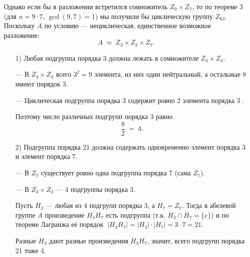 \documentclass[a4paper]{article}
\begin{document}
\begin{enumerate}
    Однако если бы в разложении встретился сомножитель \(Z_{9}\times Z_7\), то по теореме 3 (для \(n=9\cdot7\), \(\gcd(9,7)=1\))  
    мы получили бы циклическую группу \(Z_{63}\).
    Поскольку \(A\) по условию — нециклическая, единственное возможное разложение:  
    \[
      A\;\simeq\;Z_{3}\times Z_{3}\times Z_{7}.
    \]
    \begin{enumerate}
        \item[1)]
        Любая подгруппа порядка 3 должна лежать в сомножителе \(Z_3\times Z_3\).  
        
        — В \(Z_3\times Z_3\) всего \(3^2=9\) элемента, из них один нейтральный, а остальные 8 имеют порядок 3.  
        
        — Циклическая подгруппа порядка 3 содержит ровно 2 элемента порядка 3 .  
        
        Поэтому число различных подгрупп порядка 3 равно  
        \[
        \frac{8}{2} \;=\;4.
        \]

        \item[2)]Подгруппа порядка 21 должна содержать одновременно элемент порядка 3 и элемент порядка 7.  
        
        — В \(Z_7\) существует ровно одна подгруппа порядка 7 (сама \(Z_7\)).  
        
        — В \(Z_3\times Z_3\) — 4 подгруппы порядка 3.  

        Пусть \(H_3\) — любая из 4 подгрупп порядка 3, а \(H_7=Z_7\). Тогда в абелевой группе \(A\) произведение \(H_3H_7\) есть подгруппа (т.к. \(H_3\cap H_7=\{e\}\)) и по теореме Лагранжа её порядок  
        \(\;|H_3H_7|=|H_3|\cdot|H_7|=3\cdot7=21\).  
        
        Разные \(H_3\) дают разные произведения \(H_3H_7\), значит, всего подгрупп порядка 21 тоже 4.

    \end{enumerate}
            

\end{enumerate}
\end{document}
